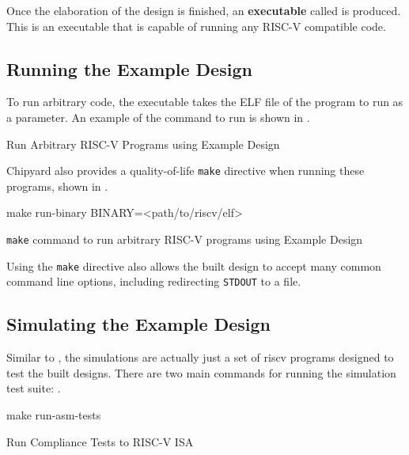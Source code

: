 Once the \gls{elaboration} of the design is finished, an \textbf{executable} called  is produced.
This is an executable that is capable of running any RISC-V compatible code.

\subsection{Running the Example Design}\label{sec:Running_Example_Design}
To run arbitrary code, the executable takes the ELF file of the program to run as a parameter.
An example of the command to run is shown in .

\begin{listing}[h!tbp]
\caption{Run Arbitrary RISC-V Programs using Example Design}
\label{lst:Running_Example_Design}
\end{listing}

Chipyard also provides a quality-of-life \texttt{make} directive when running these programs, shown in .

\begin{listing}[h!tbp]
\begin{bashsource}
make run-binary BINARY=<path/to/riscv/elf>
\end{bashsource}
\caption{\texttt{make} command to run arbitrary RISC-V programs using Example Design}
\label{lst:Running_Example_Design-Make}
\end{listing}

Using the \texttt{make} directive also allows the built design to accept many common command line options, including redirecting \texttt{STDOUT} to a file.

\subsection{Simulating the Example Design}\label{sec:Simulating_Example_Design}
Similar to , the simulations are actually just a set of \Gls{riscv} programs designed to test the built designs.
There are two main commands for running the simulation test suite: .

\begin{listing}[h!tbp]
\begin{bashsource}
make run-asm-tests
\end{bashsource}
\caption{Run Compliance Tests to RISC-V ISA}
\label{lst:ASM_Tests}
\end{listing}

